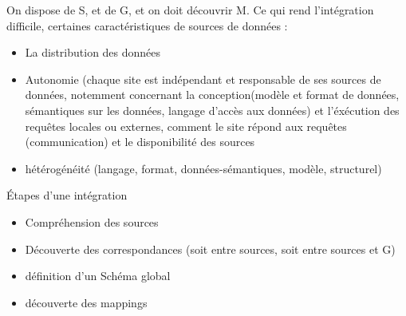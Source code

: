 On dispose de S, et de G, et on doit découvrir M.
\vskip 1cm
Ce qui rend l'intégration difficile, certaines caractéristiques de sources de données :
\begin{itemize}
\item La distribution des données
\item Autonomie (chaque site est indépendant et responsable de ses sources de données, notemment concernant la conception(modèle et format de données, sémantiques sur les données, langage d'accès aux données) et l'éxécution des requêtes locales ou externes, comment le site répond aux requêtes (communication) et le disponibilité des sources
\item hétérogénéité (langage, format, données-sémantiques, modèle, structurel)

\end{itemize}

Étapes d'une intégration 
\begin{itemize}
\item Compréhension des sources
\item Découverte des correspondances (soit entre sources, soit entre sources et G)
\item définition d'un Schéma global
\item découverte des mappings
\end{itemize}

